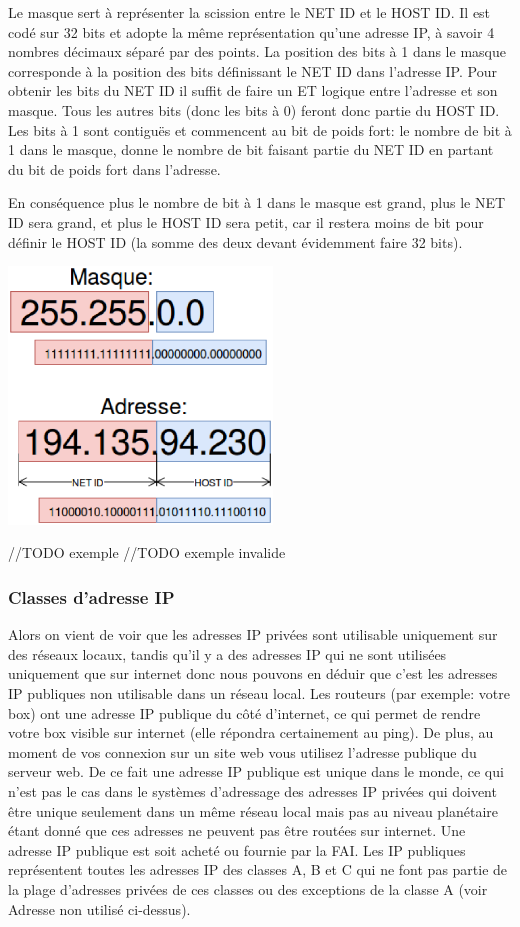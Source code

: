 Le masque sert à représenter la scission entre le NET ID et le HOST ID.
Il est codé sur 32 bits et adopte la même représentation qu'une adresse IP, à savoir
4 nombres décimaux séparé par des points.
La position des bits à 1 dans le masque corresponde à la position des bits définissant le NET ID dans l'adresse IP.
Pour obtenir les bits du NET ID il suffit de faire un ET logique entre l'adresse et son masque. Tous les autres bits (donc les bits à 0)
feront donc partie du HOST ID.
Les bits à 1 sont contiguës et commencent au bit de poids fort: le nombre de bit à 1 dans le masque, donne
le nombre de bit faisant partie du NET ID en partant du bit de poids fort dans l'adresse.

En conséquence plus le nombre de bit à 1 dans le masque est grand, plus le NET ID sera grand, et plus le HOST ID sera petit, car il restera moins de bit pour définir le HOST ID (la somme des deux devant évidemment faire 32 bits).

\begin{center}
\includegraphics[width=7cm]{./pics/maskipv4.eps}
\end{center}

//TODO exemple
//TODO exemple invalide

\subsubsection{Classes d'adresse IP}



Alors on vient de voir que les adresses IP privées sont utilisable uniquement
sur des réseaux locaux, tandis qu’il y a des adresses IP qui ne sont utilisées
uniquement que sur internet donc nous pouvons en déduir que c’est les adresses
IP publiques non utilisable dans un réseau local. Les routeurs (par exemple:
votre box) ont une adresse IP publique du côté d’internet, ce qui permet de
rendre votre box visible sur internet (elle répondra certainement au ping). De
plus, au moment de vos connexion sur un site web vous utilisez l’adresse
publique du serveur web. De ce fait une adresse IP publique est unique dans le
monde, ce qui n’est pas le cas dans le systèmes d’adressage des adresses IP
privées qui doivent être unique seulement dans un même réseau local mais pas au
niveau planétaire étant donné que ces adresses ne peuvent pas être routées sur
internet. Une adresse IP publique est soit acheté ou fournie par la FAI.  Les
IP publiques représentent toutes les adresses IP des classes A, B et C qui ne
font pas partie de la plage d’adresses privées de ces classes ou des exceptions
de la classe A (voir Adresse non utilisé ci-dessus).


